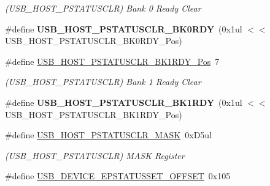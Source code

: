 \begin{DoxyCompactItemize}
\begin{DoxyCompactList}\small\item\em (U\+S\+B\+\_\+\+H\+O\+S\+T\+\_\+\+P\+S\+T\+A\+T\+U\+S\+C\+L\+R) Bank 0 Ready Clear \end{DoxyCompactList}\item 
\hypertarget{group___s_a_m_l21___u_s_b_ga537add036818c832c7fdf094c86da2ca}{}\#define {\bfseries U\+S\+B\+\_\+\+H\+O\+S\+T\+\_\+\+P\+S\+T\+A\+T\+U\+S\+C\+L\+R\+\_\+\+B\+K0\+R\+D\+Y}~(0x1ul $<$$<$ U\+S\+B\+\_\+\+H\+O\+S\+T\+\_\+\+P\+S\+T\+A\+T\+U\+S\+C\+L\+R\+\_\+\+B\+K0\+R\+D\+Y\+\_\+\+Pos)\label{group___s_a_m_l21___u_s_b_ga537add036818c832c7fdf094c86da2ca}

\item 
\hypertarget{group___s_a_m_l21___u_s_b_ga89f0ee390244f62fde34b21c8edda828}{}\#define \hyperlink{group___s_a_m_l21___u_s_b_ga89f0ee390244f62fde34b21c8edda828}{U\+S\+B\+\_\+\+H\+O\+S\+T\+\_\+\+P\+S\+T\+A\+T\+U\+S\+C\+L\+R\+\_\+\+B\+K1\+R\+D\+Y\+\_\+\+Pos}~7\label{group___s_a_m_l21___u_s_b_ga89f0ee390244f62fde34b21c8edda828}

\begin{DoxyCompactList}\small\item\em (U\+S\+B\+\_\+\+H\+O\+S\+T\+\_\+\+P\+S\+T\+A\+T\+U\+S\+C\+L\+R) Bank 1 Ready Clear \end{DoxyCompactList}\item 
\hypertarget{group___s_a_m_l21___u_s_b_ga9916c01357a29d64e92161ab1ce0b58f}{}\#define {\bfseries U\+S\+B\+\_\+\+H\+O\+S\+T\+\_\+\+P\+S\+T\+A\+T\+U\+S\+C\+L\+R\+\_\+\+B\+K1\+R\+D\+Y}~(0x1ul $<$$<$ U\+S\+B\+\_\+\+H\+O\+S\+T\+\_\+\+P\+S\+T\+A\+T\+U\+S\+C\+L\+R\+\_\+\+B\+K1\+R\+D\+Y\+\_\+\+Pos)\label{group___s_a_m_l21___u_s_b_ga9916c01357a29d64e92161ab1ce0b58f}

\item 
\hypertarget{group___s_a_m_l21___u_s_b_ga4e4c315bd97f07c8f044f7a2192a8688}{}\#define \hyperlink{group___s_a_m_l21___u_s_b_ga4e4c315bd97f07c8f044f7a2192a8688}{U\+S\+B\+\_\+\+H\+O\+S\+T\+\_\+\+P\+S\+T\+A\+T\+U\+S\+C\+L\+R\+\_\+\+M\+A\+S\+K}~0x\+D5ul\label{group___s_a_m_l21___u_s_b_ga4e4c315bd97f07c8f044f7a2192a8688}

\begin{DoxyCompactList}\small\item\em (U\+S\+B\+\_\+\+H\+O\+S\+T\+\_\+\+P\+S\+T\+A\+T\+U\+S\+C\+L\+R) M\+A\+S\+K Register \end{DoxyCompactList}\item 
\hypertarget{group___s_a_m_l21___u_s_b_gafe8b6a6a51b9b51ac504a4601101e83f}{}\#define \hyperlink{group___s_a_m_l21___u_s_b_gafe8b6a6a51b9b51ac504a4601101e83f}{U\+S\+B\+\_\+\+D\+E\+V\+I\+C\+E\+\_\+\+E\+P\+S\+T\+A\+T\+U\+S\+S\+E\+T\+\_\+\+O\+F\+F\+S\+E\+T}~0x105\label{group___s_a_m_l21___u_s_b_gafe8b6a6a51b9b51ac504a4601101e83f}


\end{DoxyCompactItemize}

